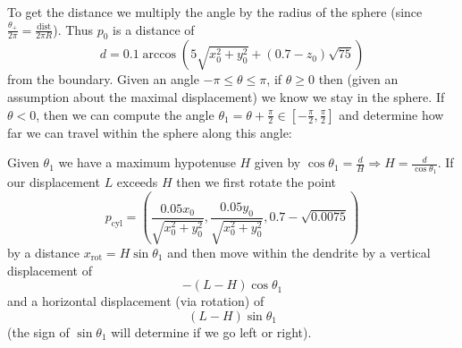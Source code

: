 \documentclass[a4paper,10pt]{article}
\begin{document}
To get the distance we multiply the angle by the radius of the sphere (since
\(\frac{\theta_+}{2 \pi} = \frac{\text{dist}}{2 \pi R}\)). Thus \(p_0\)
is a distance of
\[d = 0.1 \arccos\left(5 \sqrt{x_0^2 + y_0^2} + (0.7 - z_0)\sqrt{75}
\right)\]
from the boundary. Given an angle \(-\pi \leq \theta \leq \pi\), if \(\theta
\geq 0\) then (given an assumption about the maximal displacement) we know
we stay in the sphere. If \(\theta < 0\), then we can compute the angle
\(\theta_1 = \theta + \frac{\pi}{2} \in \left[-\frac{\pi}{2}, \frac{\pi}{2}
\right]\) and determine how far we can travel
within the sphere along this angle:
\begin{center}
\end{center}
Given \(\theta_1\) we have a maximum hypotenuse \(H\) given by
\(\cos \theta_1 = \frac{d}{H} \Rightarrow H = \frac{d}{\cos \theta_1}\).
If our displacement \(L\) exceeds \(H\) then we first rotate the point
\[p_{\text{cyl}} = \left(\frac{0.05 x_0}{\sqrt{x_0^2 + y_0^2}},
\frac{0.05 y_0}{\sqrt{x_0^2 + y_0^2}}, 0.7 - \sqrt{0.0075}\right)\]
by a distance \(x_{\text{rot}} = H \sin \theta_1\) and then move within
the dendrite by a vertical displacement of
\[\boxed{- (L - H) \cos \theta_1}\]
and a horizontal displacement (via rotation) of
\[\boxed{(L - H) \sin \theta_1}\]
(the sign of \(\sin \theta_1\) will determine if we go left or right).
\end{document}
